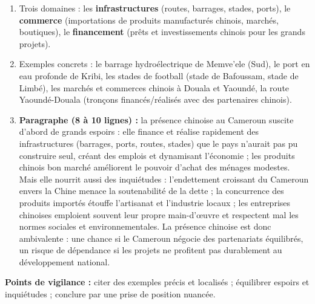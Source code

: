 \documentclass[11pt]{article}
\begin{document}
\begin{corrige}
\begin{enumerate}
\item Trois domaines : les \textbf{infrastructures} (routes, barrages, stades, ports), le \textbf{commerce} (importations de produits manufacturés chinois, marchés, boutiques), le \textbf{financement} (prêts et investissements chinois pour les grands projets).
\item Exemples concrets : le barrage hydroélectrique de Memve'ele (Sud), le port en eau profonde de Kribi, les stades de football (stade de Bafoussam, stade de Limbé), les marchés et commerces chinois à Douala et Yaoundé, la route Yaoundé-Douala (tronçons financés/réalisés avec des partenaires chinois).
\item \textbf{Paragraphe (8 à 10 lignes) :} la présence chinoise au Cameroun suscite d'abord de grands espoirs : elle finance et réalise rapidement des infrastructures (barrages, ports, routes, stades) que le pays n'aurait pas pu construire seul, créant des emplois et dynamisant l'économie ; les produits chinois bon marché améliorent le pouvoir d'achat des ménages modestes. Mais elle nourrit aussi des inquiétudes : l'endettement croissant du Cameroun envers la Chine menace la soutenabilité de la dette ; la concurrence des produits importés étouffe l'artisanat et l'industrie locaux ; les entreprises chinoises emploient souvent leur propre main-d'œuvre et respectent mal les normes sociales et environnementales. La présence chinoise est donc ambivalente : une chance si le Cameroun négocie des partenariats équilibrés, un risque de dépendance si les projets ne profitent pas durablement au développement national.
\end{enumerate}
\textbf{Points de vigilance :} citer des exemples précis et localisés ; équilibrer espoirs et inquiétudes ; conclure par une prise de position nuancée.
\end{corrige}
\end{document}
